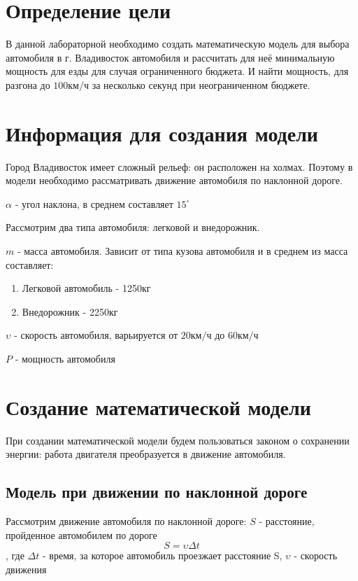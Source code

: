 \documentclass[a4paper, 14pt]{extarticle}
\begin{document}
	\pagebreak	

	\section{Определение цели}
		В данной лабораторной необходимо создать математическую модель для выбора автомобиля в г. Владивосток автомобиля и рассчитать для неё минимальную мощность для езды для случая ограниченного бюджета. И найти мощность, для разгона до \(100 \text{км}/\text{ч} \) за несколько секунд при неограниченном бюджете.

	\section{Информация для создания модели}
		Город Владивосток имеет сложный рельеф: он расположен на холмах. Поэтому в модели необходимо рассматривать движение автомобиля по наклонной дороге.
		
		\(\alpha \) - угол наклона, в среднем составляет \( 15 ^\circ \)
		
		Рассмотрим два типа автомобиля: легковой и внедорожник.
		
		\( m \) - масса автомобиля. Зависит от типа кузова автомобиля и в среднем из масса составляет:
		\begin{enumerate}[leftmargin=3\parindent, itemsep=0mm]
			\item Легковой автомобиль - 1250кг
			\item Внедорожник - 2250кг
		\end{enumerate}

		\( \upsilon \) - скорость автомобиля, варьируется от \(20 \text{км}/\text{ч} \) до \(60 \text{км}/\text{ч} \) 
		
		\( P \) - мощность автомобиля

	\section{Создание математической модели}
		При создании математической модели будем пользоваться законом о сохранении энергии: работа двигателя
		преобразуется в движение автомобиля.
		\subsection{Модель при движении по наклонной дороге}
			Рассмотрим движение автомобиля по наклонной дороге:
			\( S \) - расстояние, пройденное автомобилем по дороге
			\[ S = \upsilon \Delta t \tag{3.1.1} \label{eq:special} \]
			, где \( \Delta t \) - время, за которое автомобиль проезжает расстояние S,
			\( \upsilon \) - скорость движения
	
\end{document}
